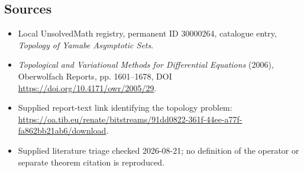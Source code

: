 \documentclass[11pt]{article}
\begin{document}
\subsection{Sources}
\begin{itemize}
\item Local UnsolvedMath registry, permanent ID 30000264, catalogue entry, \emph{Topology of Yamabe Asymptotic Sets}.
\item \emph{Topological and Variational Methods for Differential Equations} (2006), Oberwolfach Reports, pp. 1601--1678, DOI \url{https://doi.org/10.4171/owr/2005/29}.
\item Supplied report-text link identifying the topology problem: \url{https://oa.tib.eu/renate/bitstreams/91dd0822-361f-44ee-a77f-fa862bb21ab6/download}.
\item Supplied literature triage checked 2026-08-21; no definition of the operator or separate theorem citation is reproduced.
\end{itemize}
\end{document}
